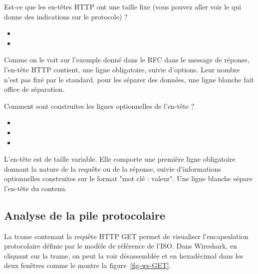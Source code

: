 {
Est-ce que les en-têtes HTTP ont une taille fixe (vous pouvez aller voir le  qui donne des indications sur le protocole) ?
\begin{itemize}[label=$\circ$]
   \item {}
   \item {}
 \end{itemize}
}
{
Comme on le voit sur l'exemple donné dans le RFC dans le message de réponse, l'en-tête HTTP contient, une ligne obligatoire, suivie d'options. Leur nombre n'est pas fixé par le standard. pour les séparer des données, une ligne blanche fait office de séparation.
}

{
Comment sont construites les lignes optionnelles de l'en-tête ?
\begin{itemize}[label=$\circ$]
   \item {}
   \item {}
   \item {}
 \end{itemize}
}
{
L'en-tête est de taille variable. Elle comporte une première ligne obligatoire donnant la nature de la requête ou de la réponse, suivie d'informations optionnelles construites sur le format "mot clé : valeur". Une ligne blanche sépare l'en-tête du contenu.
}

\subsection{Analyse de la pile protocolaire}

La trame contenant la requête HTTP GET permet de visualiser l'encapsulation protocolaire définie par le modèle de référence de l'\ac{ISO}. Dans Wireshark, en cliquant sur la trame, on peut la voir désassemblée et en hexadécimal dans les deux fenêtres comme le montre la figure~\vref{fig-ws-GET}.

